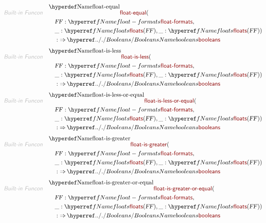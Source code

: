\begin{align*}
  \KEY{Built-in Funcon} \quad
  & \NAMEDECL{float-equal}(\\&\quad
                       \VAR{FF} : \NAMEREF{float-formats}, \\&\quad
                       \_ : \NAMEREF{floats}
                                 (  \VAR{FF} ), \_ : \NAMEREF{floats}
                                 (  \VAR{FF} )) \\&\quad
    :  \TO \NAMEHYPER{../.}{Booleans}{booleans} 
\end{align*}
\begin{align*}
  \KEY{Built-in Funcon} \quad
  & \NAMEDECL{float-is-less}(\\&\quad
                       \VAR{FF} : \NAMEREF{float-formats}, \\&\quad
                       \_ : \NAMEREF{floats}
                                 (  \VAR{FF} ), \_ : \NAMEREF{floats}
                                 (  \VAR{FF} )) \\&\quad
    :  \TO \NAMEHYPER{../.}{Booleans}{booleans} 
\end{align*}
\begin{align*}
  \KEY{Built-in Funcon} \quad
  & \NAMEDECL{float-is-less-or-equal}(\\&\quad
                       \VAR{FF} : \NAMEREF{float-formats}, \\&\quad
                       \_ : \NAMEREF{floats}
                                 (  \VAR{FF} ), \_ : \NAMEREF{floats}
                                 (  \VAR{FF} )) \\&\quad
    :  \TO \NAMEHYPER{../.}{Booleans}{booleans} 
\end{align*}
\begin{align*}
  \KEY{Built-in Funcon} \quad
  & \NAMEDECL{float-is-greater}(\\&\quad
                       \VAR{FF} : \NAMEREF{float-formats}, \\&\quad
                       \_ : \NAMEREF{floats}
                                 (  \VAR{FF} ), \_ : \NAMEREF{floats}
                                 (  \VAR{FF} )) \\&\quad
    :  \TO \NAMEHYPER{../.}{Booleans}{booleans} 
\end{align*}
\begin{align*}
  \KEY{Built-in Funcon} \quad
  & \NAMEDECL{float-is-greater-or-equal}(\\&\quad
                       \VAR{FF} : \NAMEREF{float-formats}, \\&\quad
                       \_ : \NAMEREF{floats}
                                 (  \VAR{FF} ), \_ : \NAMEREF{floats}
                                 (  \VAR{FF} )) \\&\quad
    :  \TO \NAMEHYPER{../.}{Booleans}{booleans} 
\end{align*}
